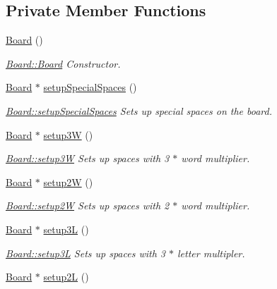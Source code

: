 \subsection*{Private Member Functions}
\begin{DoxyCompactItemize}
\item 
\hyperlink{class_board_a9ee491d4fea680cf69b033374a9fdfcb}{Board} ()
\begin{DoxyCompactList}\small\item\em \hyperlink{class_board_a9ee491d4fea680cf69b033374a9fdfcb}{Board\-::\-Board} Constructor. \end{DoxyCompactList}\item 
\hyperlink{class_board}{Board} $\ast$ \hyperlink{class_board_af09b7eb32a7b1bee3aa0b8e9702262a8}{setup\-Special\-Spaces} ()
\begin{DoxyCompactList}\small\item\em \hyperlink{class_board_af09b7eb32a7b1bee3aa0b8e9702262a8}{Board\-::setup\-Special\-Spaces} Sets up special spaces on the board. \end{DoxyCompactList}\item 
\hyperlink{class_board}{Board} $\ast$ \hyperlink{class_board_a04c1b8a27cb98af441adf28c860801a9}{setup3\-W} ()
\begin{DoxyCompactList}\small\item\em \hyperlink{class_board_a04c1b8a27cb98af441adf28c860801a9}{Board\-::setup3\-W} Sets up spaces with 3 $\ast$ word multiplier. \end{DoxyCompactList}\item 
\hyperlink{class_board}{Board} $\ast$ \hyperlink{class_board_ab2c7d1364979e2296aaee238dec0ed41}{setup2\-W} ()
\begin{DoxyCompactList}\small\item\em \hyperlink{class_board_ab2c7d1364979e2296aaee238dec0ed41}{Board\-::setup2\-W} Sets up spaces with 2 $\ast$ word multiplier. \end{DoxyCompactList}\item 
\hyperlink{class_board}{Board} $\ast$ \hyperlink{class_board_a3a6d2d854db811443f469237b3c8dbf5}{setup3\-L} ()
\begin{DoxyCompactList}\small\item\em \hyperlink{class_board_a3a6d2d854db811443f469237b3c8dbf5}{Board\-::setup3\-L} Sets up spaces with 3 $\ast$ letter multipler. \end{DoxyCompactList}\item 
\hyperlink{class_board}{Board} $\ast$ \hyperlink{class_board_a716521053c43060f4ec4b8ce59ab6972}{setup2\-L} ()

\end{DoxyCompactItemize}
